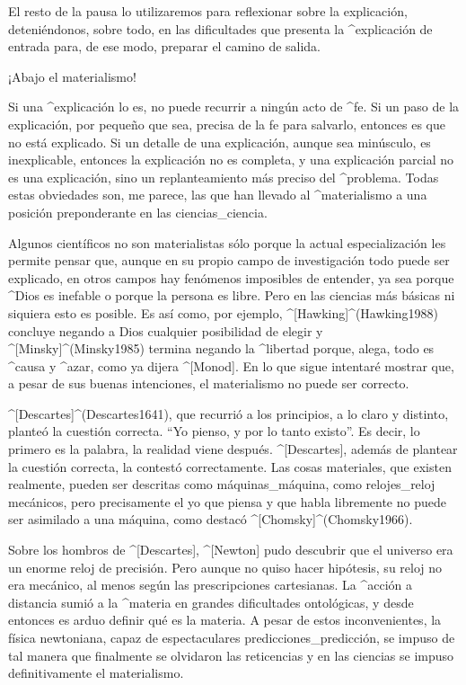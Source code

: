 El resto de la pausa lo utilizaremos para reflexionar sobre la
explicación, deteniéndonos, sobre todo, en las dificultades que presenta
la ^{explicación de entrada} para, de ese modo, preparar el camino de
salida.


\Section ¡Abajo el materialismo!

Si una ^{explicación} lo es, no puede recurrir a ningún acto de ^{fe}.
Si un paso de la explicación, por pequeño que sea, precisa de la fe para
salvarlo, entonces es que no está explicado. Si un detalle de una
explicación, aunque sea minúsculo, es inexplicable, entonces la
explicación no es completa, y una explicación parcial no es una
explicación, sino un replanteamiento más preciso del ^{problema}. Todas
estas obviedades son, me parece, las que han llevado al ^{materialismo}
a una posición preponderante en las ciencias_{ciencia}.

Algunos científicos no son materialistas sólo porque la actual
especialización les permite pensar que, aunque en su propio campo de
investigación todo puede ser explicado, en otros campos hay fenómenos
imposibles de entender, ya sea porque ^{Dios} es inefable o porque la
persona es libre. Pero en las ciencias más básicas ni siquiera esto es
posible. Es así como, por ejemplo, ^[Hawking]^(Hawking1988) concluye
negando a Dios cualquier posibilidad de elegir y ^[Minsky]^(Minsky1985)
termina negando la ^{libertad} porque, alega, todo es ^{causa} y
^{azar}, como ya dijera ^[Monod]. En lo que sigue intentaré mostrar que,
a pesar de sus buenas intenciones, el materialismo no puede ser
correcto.

^[Descartes]^(Descartes1641), que recurrió a los principios, a lo claro
y distinto, planteó la cuestión correcta. ``Yo pienso, y por lo tanto
existo''. Es decir, lo primero es la palabra, la realidad viene después.
^[Descartes], además de plantear la cuestión correcta, la contestó
correctamente. Las cosas materiales, que existen realmente, pueden ser
descritas como máquinas_{máquina}, como relojes_{reloj} mecánicos, pero
precisamente el yo que piensa y que habla libremente no puede ser
asimilado a una máquina, como destacó ^[Chomsky]^(Chomsky1966).

Sobre los hombros de ^[Descartes], ^[Newton] pudo descubrir que el
universo era un enorme reloj de precisión. Pero aunque no quiso hacer
hipótesis, su reloj no era mecánico, al menos según las prescripciones
cartesianas. La ^{acción a distancia} sumió a la ^{materia} en grandes
dificultades ontológicas, y desde entonces es arduo definir qué es la
materia. A pesar de estos inconvenientes, la física newtoniana, capaz de
espectaculares predicciones_{predicción}, se impuso de tal manera que
finalmente se olvidaron las reticencias y en las ciencias se impuso
definitivamente el materialismo.

